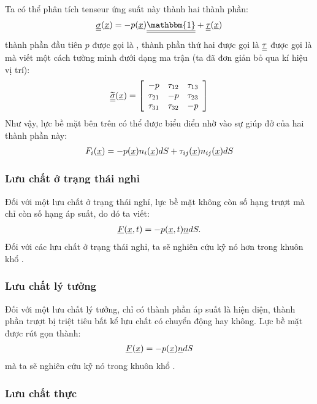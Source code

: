 \documentclass[CO_LUU_CHAT.tex]{subfiles}
\begin{document}
		Ta có thể phân tích tenseur ứng suất này thành hai thành phần:
		\begin{align}
			\dt\sigma(\vt x)=-p(\vt x)\dt{\mathbbm{1}}+\dt\tau(\vt x)
		\end{align}
		thành phần đầu tiên $p$ được gọi là , thành phần thứ hai được gọi là $\underline{\underline{\tau}}$ được gọi là  mà viết một cách tường minh đưới dạng ma trận (ta đã đơn giản bỏ qua kí hiệu vị trí):
		\begin{align}
			\widetilde{\dt\sigma}(\vt x)=
				\left[
					\begin{array}{*{20}{c}}
						-p&\tau_{12}&\tau_{13}\\
						\tau_{21}&-p&\tau_{23}\\
						\tau _{31}&\tau_{32}&-p
					\end{array}
				\right]
		\end{align}
		Như vậy, lực bề mặt bên trên có thể được biểu diển nhờ vào sự giúp đở của hai thành phần này:
		\begin{align}
			F_i(\underline{x})=-p(\underline{x})n_i(\underline{x})dS+\tau_{ij}(\underline{x})n_{ij}(\underline{x})dS
		\end{align}

\subsubsection{Lưu chất ở trạng thái nghỉ}

		Đối với một lưu chất ở trạng thái nghỉ, lực bề mặt không còn số hạng trượt mà chỉ còn số hạng áp suất, do dó ta viết:
		\begin{align}
			\underline{F}(\underline{x},t)=-p(\underline{x},t)\underline{n}dS.
		\end{align}
		Đối với các lưu chất ở trạng thái nghỉ, ta sẽ nghiên cứu kỹ nó hơn trong khuôn khổ .

\subsubsection{Lưu chất lý tưởng}

		Đối với một lưu chất lý tưởng, chỉ có thành phần áp suất là hiện diện, thành phần trượt bị triệt tiêu bất kể lưu chất có chuyển động hay không. Lực bề mặt được rút gọn thành:
			\begin{align}
				\underline{F}(\underline{x})=-p(\underline{x})\underline{n}dS
			\end{align}
		mà ta sẽ nghiên cứu kỹ nó trong khuôn khổ .
\subsubsection{Lưu chất thực}
\end{document}

